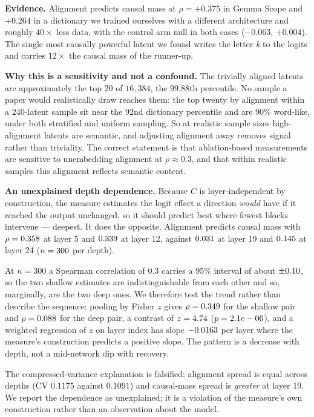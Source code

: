 \documentclass[11pt]{article}
\begin{document}
\textbf{Evidence.} Alignment predicts causal mass at $\rho=+0.375$ in Gemma Scope
and $+0.264$ in a dictionary we trained ourselves with a different architecture
and roughly $40\times$ less data, with the control arm null in both cases
($-0.063$, $+0.004$). The single most causally powerful latent we found writes the
letter \emph{k} to the logits and carries $12\times$ the causal mass of the
runner-up.

\textbf{Why this is a sensitivity and not a confound.} The trivially aligned
latents are approximately the top $20$ of $16{,}384$, the $99.88$th percentile. No
sample a paper would realistically draw reaches them: the top twenty by alignment
within a $240$-latent sample sit near the $92$nd dictionary percentile and are
$90\%$ word-like, under both stratified and uniform sampling. So at realistic
sample sizes high-alignment latents are semantic, and adjusting alignment away
removes signal rather than triviality. The correct statement is that
ablation-based measurements are sensitive to unembedding alignment at
$\rho\approx0.3$, and that within realistic samples this alignment reflects
semantic content.

\textbf{An unexplained depth dependence.} Because $C$ is layer-independent by
construction, the measure estimates the logit effect a direction \emph{would} have
if it reached the output unchanged, so it should predict best where fewest blocks
intervene --- deepest. It does the opposite. Alignment predicts causal mass with
$\rho=0.358$ at layer 5 and $0.339$ at layer 12, against $0.031$
at layer 19 and $0.145$ at layer 24 ($n=300$ per depth).

At $n=300$ a Spearman correlation of $0.3$ carries a $95\%$ interval of about
$\pm0.10$, so the two shallow estimates are indistinguishable from each
other and so, marginally, are the two deep ones. We therefore test the trend
rather than describe the sequence: pooling by Fisher $z$ gives
$\rho=0.349$ for the shallow pair and $\rho=0.088$ for the deep pair, a
contrast of $z=4.74$ ($p=2.1e-06$), and a weighted regression of
$z$ on layer index has slope $-0.0163$ per layer where the measure's
construction predicts a positive slope. The pattern is a decrease with depth, not
a mid-network dip with recovery.

The compressed-variance explanation is falsified: alignment spread is equal across
depths (CV $0.1175$ against $0.1091$) and causal-mass spread is \emph{greater} at
layer 19. We report the dependence as unexplained; it is a violation of the
measure's own construction rather than an observation about the model.
\end{document}
